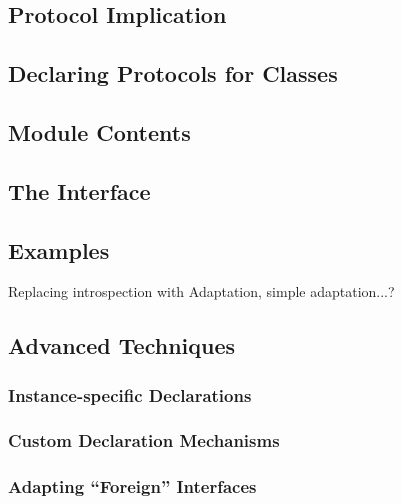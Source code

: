 \subsection{Protocol Implication \label{proto-implication}}

\subsection{Declaring Protocols for Classes}

\subsection{Module Contents}

\subsection{The  Interface \label{open-protocols}}
\subsection{Examples}
Replacing introspection with Adaptation, simple adaptation...?

\subsection{Advanced Techniques}
\subsubsection{Instance-specific Declarations}
\subsubsection{Custom Declaration Mechanisms}
\subsubsection{Adapting ``Foreign'' Interfaces}

